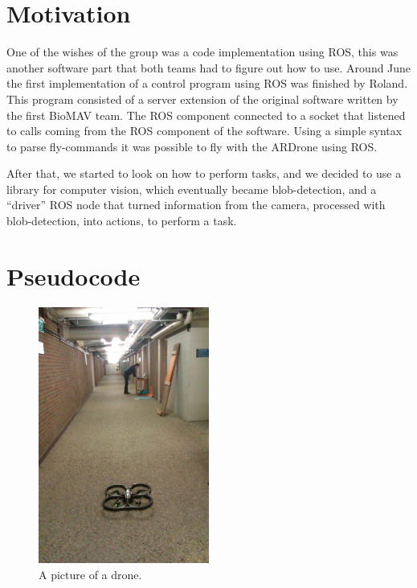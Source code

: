 \documentclass[a4paper,10pt]{article}
\begin{document}
\section{Motivation}
\label{sec:motivation}
One of the wishes of the group was a code implementation using ROS, this was another software part that both teams had to figure out how to use. 
Around June the first implementation of a control program using ROS was finished by Roland. 
This program consisted of a server extension of the original software written by the first BioMAV team.  
The ROS component connected to a socket that listened to calls coming from the ROS component of the software. 
Using a simple syntax to parse fly-commands it was possible to fly with the ARDrone using ROS.  

After that, we started to look on how to perform tasks, and we decided
to use a library for computer vision, which eventually became
blob-detection, and a ``driver'' ROS node that turned information from
the camera, processed with blob-detection, into actions, to perform a
task.




\section{Pseudocode}
\label{sec:pseudocode}
\begin{figure}[h!]
	\caption{A picture of a drone.}
	\centering
	\includegraphics[width=0.5\textwidth]{images/boringHallway}
\end{figure}
\end{document}
